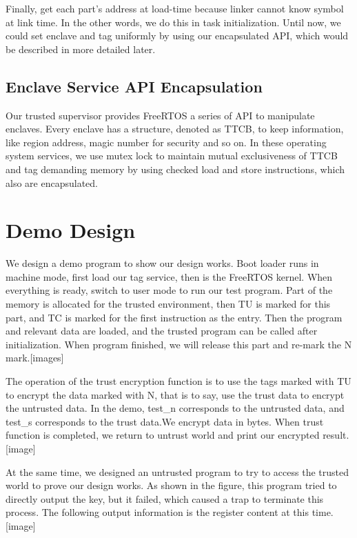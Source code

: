 \documentclass[conference]{IEEEtran}
\begin{document}
Finally, get each part's address at load-time because linker cannot know symbol at link time. In the other words, we do this in task initialization. Until now, we could set enclave and tag uniformly by using our encapsulated API, which would be described in more detailed later.

\subsection{Enclave Service API Encapsulation}

Our trusted supervisor provides FreeRTOS a series of API to manipulate enclaves. Every enclave has a structure, denoted as TTCB, to keep information, like region address, magic number for security and so on. In these operating system services, we use mutex lock to maintain mutual exclusiveness of TTCB and tag demanding memory by using checked load and store instructions, which also are encapsulated.

\section{Demo Design}
We design a demo program to show our design works. Boot loader runs in machine mode, first load our tag service, then is the FreeRTOS kernel. When everything is ready, switch to user mode to run our test program. Part of the memory is allocated for the trusted environment, then TU is marked for this part, and TC is marked for the first instruction as the entry. Then the program and relevant data are loaded, and the trusted program can be called after initialization. When program finished, we will release this part and re-mark the N mark.[images]

The operation of the trust encryption function is to use the tags marked with TU to encrypt the data marked with N, that is to say, use the trust data to encrypt the untrusted data. In the demo, test\_n corresponds to the untrusted data, and test\_s corresponds to the trust data.We encrypt data in bytes. When  trust function is completed, we return to untrust world and print our encrypted result.[image]

At the same time, we designed an untrusted program to try to access the trusted world to prove our design works. As shown in the figure, this program tried to directly output the key, but it failed, which caused a trap to terminate this process. The following output information is the register content at this time.[image]
\end{document}
